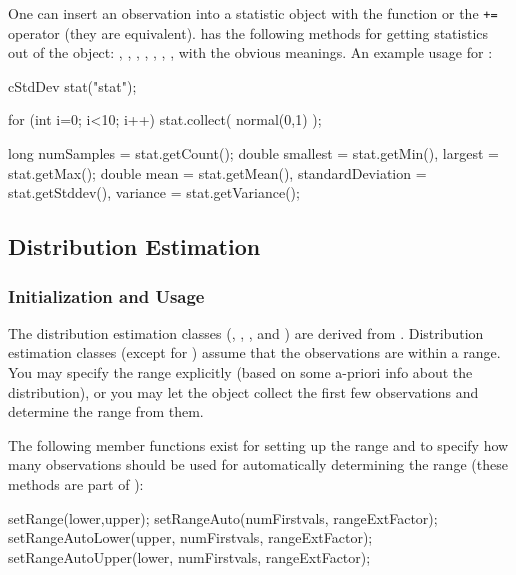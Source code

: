 One can insert an observation into a statistic object with the
 function or the \texttt{+=} operator (they are
equivalent).   has the following methods for getting
statistics out of the object: , ,
, , , ,
,  with the obvious meanings. An example
usage for :

\begin{cpp}
cStdDev stat("stat");

for (int i=0; i<10; i++)
  stat.collect( normal(0,1) );

long numSamples = stat.getCount();
double smallest = stat.getMin(),
       largest = stat.getMax();
double mean = stat.getMean(),
       standardDeviation = stat.getStddev(),
       variance = stat.getVariance();
\end{cpp}





\subsection{Distribution Estimation}

\subsubsection{Initialization and Usage}


The distribution estimation classes
(, , ,
 and ) are derived from
. Distribution estimation classes (except for
) assume that the observations are within a range.
You may specify the range explicitly (based on some a-priori info
about the distribution), or you may let the object collect the first
few observations and determine the range from them.

The following member functions exist for setting up the range
and to specify how many observations should be used for automatically
determining the range (these methods are part of ):

\begin{cpp}
setRange(lower,upper);
setRangeAuto(numFirstvals, rangeExtFactor);
setRangeAutoLower(upper, numFirstvals, rangeExtFactor);
setRangeAutoUpper(lower, numFirstvals, rangeExtFactor);
\end{cpp}


